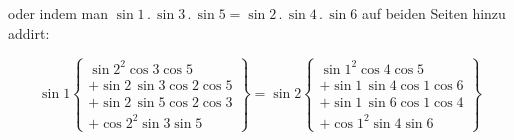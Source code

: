 oder indem man $\sin 1 \, . \, \sin 3 \, . \, \sin 5 = \sin 2 \, . \, \sin 4 \, . \, \sin 6$ auf beiden Seiten hinzu addirt:

\[
\sin 1 \left\{\begin{array}{l} \sin 2^2 \cos 3 \cos 5 \\ + \sin 2 \, \sin 3 \cos 2 \cos 5 \\ + \sin 2 \, \sin 5 \cos 2 \cos 3 \\ + \cos 2^2 \sin 3 \sin 5 \end{array}\right\}
= \sin 2 \left\{\begin{array}{l} \sin 1^2 \cos 4 \cos 5 \\ + \sin 1 \, \sin 4 \cos 1 \cos 6 \\ + \sin 1 \, \sin 6 \cos 1 \cos 4 \\ + \cos 1^2 \sin 4 \sin 6 \end{array}\right\}
\]

